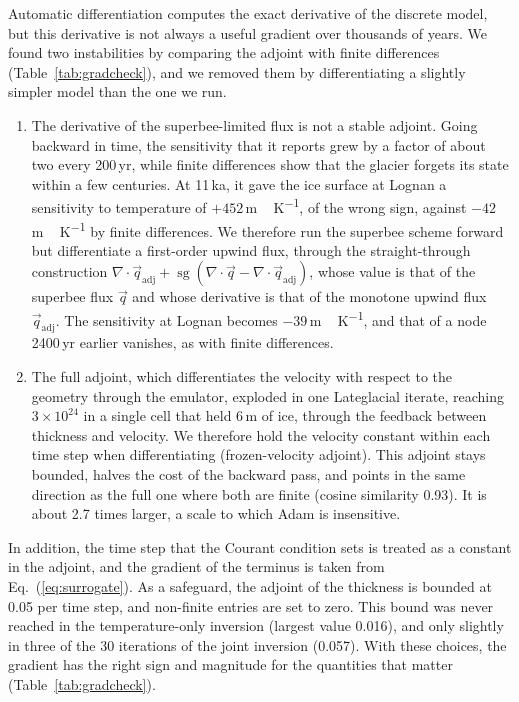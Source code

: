 \documentclass[tc, manuscript]{copernicus}
\newcommand{\sg}{\operatorname{sg}}
\begin{document}
Automatic differentiation computes the exact derivative of the discrete model, but this derivative is not always a useful gradient over thousands of years. We found two instabilities by comparing the adjoint with finite differences (Table~\ref{tab:gradcheck}), and we removed them by differentiating a slightly simpler model than the one we run.
\begin{enumerate}
\item The derivative of the superbee-limited flux is not a stable adjoint. Going backward in time, the sensitivity that it reports grew by a factor of about two every 200\,yr, while finite differences show that the glacier forgets its state within a few centuries. At 11\,ka, it gave the ice surface at Lognan a sensitivity to temperature of $+452$\,\unit{m\,K^{-1}}, of the wrong sign, against $-42$\,\unit{m\,K^{-1}} by finite differences. We therefore run the superbee scheme forward but differentiate a first-order upwind flux, through the straight-through construction $\nabla\cdot\vec q_\mathrm{adj}+\sg(\nabla\cdot\vec q-\nabla\cdot\vec q_\mathrm{adj})$, whose value is that of the superbee flux $\vec q$ and whose derivative is that of the monotone upwind flux $\vec q_\mathrm{adj}$. The sensitivity at Lognan becomes $-39$\,\unit{m\,K^{-1}}, and that of a node 2400\,yr earlier vanishes, as with finite differences.
\item The full adjoint, which differentiates the velocity with respect to the geometry through the emulator, exploded in one Lateglacial iterate, reaching $3\times10^{24}$ in a single cell that held 6\,m of ice, through the feedback between thickness and velocity. We therefore hold the velocity constant within each time step when differentiating (frozen-velocity adjoint). This adjoint stays bounded, halves the cost of the backward pass, and points in the same direction as the full one where both are finite (cosine similarity 0.93). It is about 2.7 times larger, a scale to which Adam is insensitive.
\end{enumerate}
In addition, the time step that the Courant condition sets is treated as a constant in the adjoint, and the gradient of the terminus is taken from Eq.~(\ref{eq:surrogate}). As a safeguard, the adjoint of the thickness is bounded at 0.05 per time step, and non-finite entries are set to zero. This bound was never reached in the temperature-only inversion (largest value 0.016), and only slightly in three of the 30 iterations of the joint inversion (0.057). With these choices, the gradient has the right sign and magnitude for the quantities that matter (Table~\ref{tab:gradcheck}).
\end{document}
